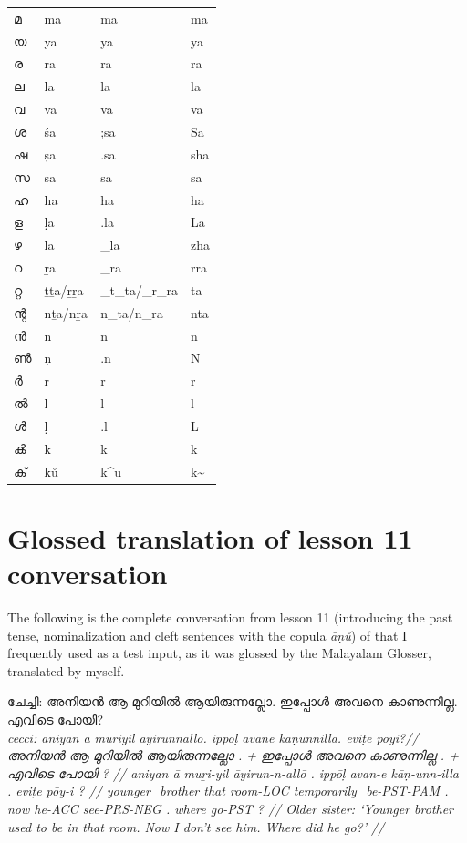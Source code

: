 \documentclass[a4paper]{article}
\begin{document}
\begin{longtable}[l]{p{2.3cm} p{2.3cm} p{2.3cm} p{2.3cm}}
മ & ma & ma & ma \\
യ & ya & ya & ya \\
ര & ra & ra & ra \\
ല & la & la & la \\
വ & va & va & va \\
ശ & śa & ;sa & Sa \\
ഷ & ṣa & .sa & sha \\
സ & sa & sa & sa \\
ഹ & ha & ha & ha \\
ള & ḷa & .la & La \\
ഴ & ḻa & \_la & zha \\
റ & ṟa & \_ra & rra \\
റ്റ & ṯṯa/ṟṟa & \_t\_ta/\_r\_ra & ta \\
ന്റ & nṯa/nṟa & n\_ta/n\_ra & nta \\
ൻ & n & n & n \\
ൺ & ṇ & .n & N \\
ർ & r & r & r \\
ൽ & l & l & l \\
ൾ & ḷ & .l & L \\
ൿ & k & k & k \\
ക് & kŭ & k\^{}u & k\textasciitilde \\
\end{longtable}

\section{Glossed translation of lesson 11 conversation}

The following is the complete conversation from lesson 11 (introducing the past tense, nominalization and cleft sentences with the copula \textit{āṇŭ}) of \textcite{moag} that I frequently used as a test input, as it was glossed by the Malayalam Glosser, translated by myself.

\ex\begingl
\glpreamble ചേച്ചി: അനിയൻ ആ മുറിയിൽ ആയിരുന്നല്ലോ. ഇപ്പോൾ അവനെ കാണുന്നില്ല. എവിടെ പോയി? \\
\itshape cēcci: aniyan ā muṟiyil āyirunnallō. ippōḷ avane kāṇunnilla. eviṭe pōyi?//
\gla അനിയൻ ആ മുറിയിൽ ആയിരുന്നല്ലോ . + ഇപ്പോൾ അവനെ കാണുന്നില്ല . + എവിടെ പോയി ? //
\glb aniyan ā muṟi-yil āyirun-n-allō . ippōḷ avan-e kāṇ-unn-illa . eviṭe pōy-i ? //
\glc younger\_brother that room-LOC temporarily\_be-PST-PAM . now he-ACC see-PRS-NEG . where go-PST ? //
\glft Older sister: `Younger brother used to be in that room. Now I don't see him. Where did he go?' //
\endgl\xe
\end{document}
